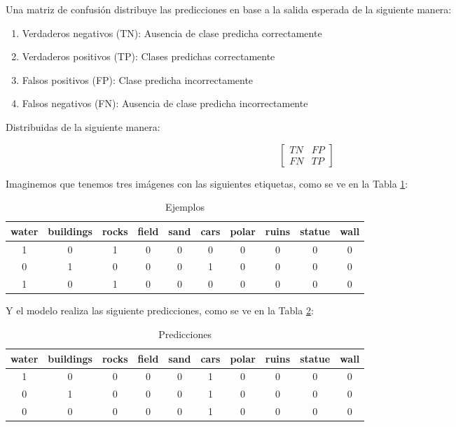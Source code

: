 Una matriz de confusión distribuye las predicciones en base a la salida esperada de la siguiente manera:

\begin{enumerate}
	\item Verdaderos negativos (TN): Ausencia de clase predicha correctamente
	\item Verdaderos positivos (TP): Clases predichas correctamente
	\item Falsos positivos (FP): Clase predicha incorrectamente
	\item Falsos negativos (FN): Ausencia de clase predicha incorrectamente
\end{enumerate}

Distribuidas de la siguiente manera:

\[\begin{bmatrix}
	TN & FP\\
	FN & TP
\end{bmatrix}\]

\newpage

Imaginemos que tenemos tres imágenes con las siguientes etiquetas, como se ve en la Tabla \ref{table:examples}:

\begin{table}[!h]
	\centering
	
	\begin{tabular}{ c c c c c c c c c c }
		\hline
		water & buildings & rocks & field & sand & cars & polar & ruins & statue & wall\\ [0.5ex] 
		\hline\hline
		1 & 0 & 1 & 0 & 0 & 0 & 0 & 0 & 0 & 0 \\ 
		0 & 1 & 0 & 0 & 0 & 1 & 0 & 0 & 0 & 0 \\  
		1 & 0 & 1 & 0 & 0 & 0 & 0 & 0 & 0 & 0    
	\end{tabular}
	\caption{Ejemplos}
	\label{table:examples}
\end{table}

Y el modelo realiza las siguiente predicciones, como se ve en la Tabla \ref{table:predictions}:

\begin{table}[!h]
	\centering
	
	\begin{tabular}{ c c c c c c c c c c }
		\hline
		water & buildings & rocks & field & sand & cars & polar & ruins & statue & wall\\ [0.5ex] 
		\hline\hline
		1 & 0 & 0 & 0 & 0 & 1 & 0 & 0 & 0 & 0 \\ 
		0 & 1 & 0 & 0 & 0 & 1 & 0 & 0 & 0 & 0 \\  
		0 & 0 & 0 & 0 & 0 & 1 & 0 & 0 & 0 & 0    
	\end{tabular}
	\caption{Predicciones}
	\label{table:predictions}
\end{table}

